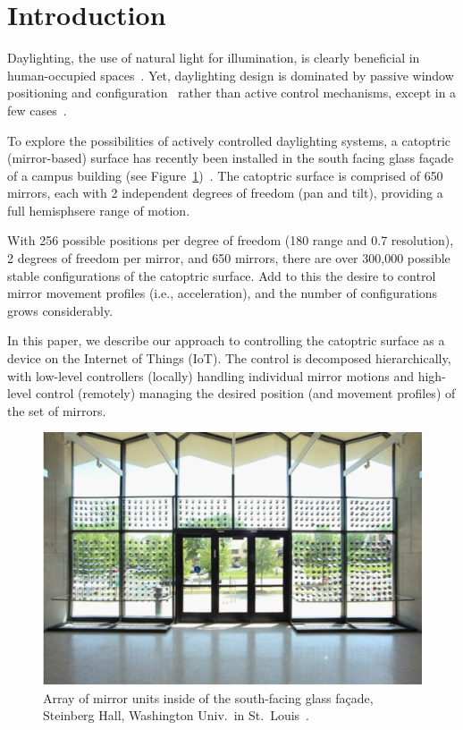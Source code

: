 \section{Introduction}
\label{sec:intro}

Daylighting, the use of natural light for illumination, is clearly
beneficial in human-occupied
spaces~\cite{hhm15,Leslie03}.
Yet, daylighting design is dominated by passive window positioning
and configuration~\cite{Leslie03} rather than active control mechanisms,
except in a few cases~\cite{kt16}.

To explore the possibilities of actively controlled daylighting systems,
a catoptric (mirror-based) surface has recently been installed in
the south facing glass fa\c cade of a campus building
(see Figure~\ref{fig:steinberg})~\cite{acadia18}.
The catoptric surface is comprised of 650 mirrors, each with 2 independent
degrees of freedom (pan and tilt), providing a full hemisphsere
range of motion.

With 256 possible positions per degree of freedom (180\degree{} range
and 0.7\degree{} resolution), 2 degrees of freedom per mirror, and 650 mirrors, 
there are over 300,000 possible stable configurations of the catoptric surface.
Add to this the desire to control mirror movement profiles (i.e.,
acceleration), and the number of configurations grows considerably.

In this paper, we describe our approach to controlling the catoptric surface
as a device on the Internet of Things (IoT).
The control is decomposed hierarchically, with low-level controllers
(locally)
handling individual mirror motions and high-level control (remotely)
managing the
desired position (and movement profiles) of the set of mirrors.

\begin{figure}[ht]
\includegraphics[width=0.88\columnwidth]{steinberg}
\caption{Array of mirror units inside of the south-facing glass fa\c cade, Steinberg Hall, Washington Univ.~in St.~Louis~\protect\cite{acadia18}.}
\label{fig:steinberg}
\end{figure}


